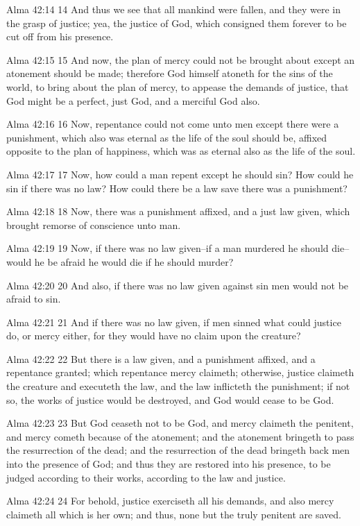 Alma 42:14
 14 And thus we see that all mankind were fallen, and they were
in the grasp of justice; yea, the justice of God, which consigned
them forever to be cut off from his presence.

Alma 42:15
 15 And now, the plan of mercy could not be brought about except
an atonement should be made; therefore God himself atoneth for
the sins of the world, to bring about the plan of mercy, to
appease the demands of justice, that God might be a perfect, just
God, and a merciful God also.

Alma 42:16
 16 Now, repentance could not come unto men except there were a
punishment, which also was eternal as the life of the soul should
be, affixed opposite to the plan of happiness, which was as
eternal also as the life of the soul.

Alma 42:17
 17 Now, how could a man repent except he should sin? How could
he sin if there was no law? How could there be a law save there
was a punishment?

Alma 42:18
 18 Now, there was a punishment affixed, and a just law given,
which brought remorse of conscience unto man.

Alma 42:19
 19 Now, if there was no law given--if a man murdered he should
die--would he be afraid he would die if he should murder?

Alma 42:20
 20 And also, if there was no law given against sin men would not
be afraid to sin.

Alma 42:21
 21 And if there was no law given, if men sinned what could
justice do, or mercy either, for they would have no claim upon
the creature?

Alma 42:22
 22 But there is a law given, and a punishment affixed, and a
repentance granted; which repentance mercy claimeth; otherwise,
justice claimeth the creature and executeth the law, and the law
inflicteth the punishment; if not so, the works of justice would
be destroyed, and God would cease to be God.

Alma 42:23
 23 But God ceaseth not to be God, and mercy claimeth the
penitent, and mercy cometh because of the atonement; and the
atonement bringeth to pass the resurrection of the dead; and the
resurrection of the dead bringeth back men into the presence of
God; and thus they are restored into his presence, to be judged
according to their works, according to the law and justice.

Alma 42:24
 24 For behold, justice exerciseth all his demands, and also
mercy claimeth all which is her own; and thus, none but the truly
penitent are saved.

